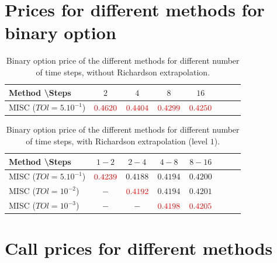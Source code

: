 \documentclass[11pt]{article}
\begin{document}
 \newpage

 


\appendix


\section{ Prices for different methods for binary option }\label{appendix:Call prices for different methods_binary}

\begin{table}[h!]
	\centering
	\begin{tabular}{l*{6}{c}r}
		Method \textbackslash  Steps            & $2$ & $4$ & $8$ & $16$ &   \\
		\hline
		MISC ($TOl=5.10^{-1}$)  & ${\color{red}0.4620}$ & $  {\color{red}0.4404}$ & ${\color{red}0.4299}$ & ${\color{red}0.4250}$  \\
		\hline
	\end{tabular}
	\caption{ Binary option price of the different methods for different number of time steps, without Richardson extrapolation.}
	\label{table: Binary option price of the different methods for different number of time steps}
\end{table}


\begin{table}[h!]
	\centering
	\begin{tabular}{l*{6}{c}r}
		Method \textbackslash  Steps   &$1-2$         & $2-4$ & $4-8$ & $8-16$  \\
		\hline
		MISC ($TOl=5.10^{-1}$) & ${\color{red}0.4239}$ & $0.4188$ & $  0.4194$ & $0.4200$   \\
			MISC ($TOl=10^{-2}$) & $-$ & ${\color{red}0.4192}$ & $  0.4194$ & $0.4201$   \\
			MISC ($TOl=10^{-3}$) & $-$ & $-$ & $  {\color{red}0.4198}$ & ${\color{red}0.4205}$   \\
		\hline
	\end{tabular}
	\caption{Binary  option price of the different methods for different number of time steps, with Richardson extrapolation (level $1$).}
	\label{table: Binary option price of the different methods for different number of time steps, binary option, with richardson, level 1}
\end{table}

\newpage


\section{ Call prices for different methods}\label{appendix:Call prices for different methods}
\end{document}
